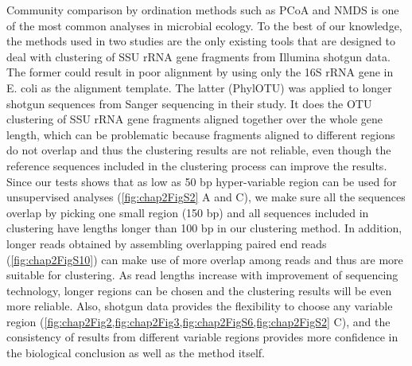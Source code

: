 \documentclass[]{msu-thesis}
\begin{document}
Community comparison by ordination methods such as PCoA and NMDS is one of the most common analyses in microbial ecology. To the best of our knowledge, the methods used in two studies \cite{luo_soil_2014,sharpton_phylotu:_2011} are the only existing tools that are designed to deal with clustering of SSU rRNA gene fragments from Illumina shotgun data. The former could result in poor alignment by using only the 16S rRNA gene in E. coli as the alignment template. The latter (PhylOTU) was applied to longer shotgun sequences from Sanger sequencing in their study. It does the OTU clustering of SSU rRNA gene fragments aligned together over the whole gene length, which can be problematic because fragments aligned to different regions do not overlap and thus the clustering results are not reliable, even though the reference sequences included in the clustering process can improve the results. Since our tests shows that as low as 50 bp hyper-variable region can be used for unsupervised analyses (\cref{fig:chap2FigS2} A and C), we make sure all the sequences overlap by picking one small region (150 bp) and all sequences included in clustering have lengths longer than 100 bp in our clustering method. In addition, longer reads obtained by assembling overlapping paired end reads (\cref{fig:chap2FigS10}) can make use of more overlap among reads and thus are more suitable for clustering. As read lengths increase with improvement of sequencing technology, longer regions can be chosen and the clustering results will be even more reliable. Also, shotgun data provides the flexibility to choose any variable region (\cref{fig:chap2Fig2,fig:chap2Fig3,fig:chap2FigS6,fig:chap2FigS2} C), and the consistency of results from different variable regions provides more confidence in the biological conclusion as well as the method itself.
\end{document}
